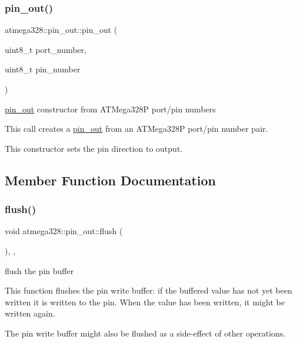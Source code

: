 \subsubsection{\texorpdfstring{pin\+\_\+out()}{pin\_out()}}
{\footnotesize\ttfamily atmega328\+::pin\+\_\+out\+::pin\+\_\+out (\begin{DoxyParamCaption}\item[{uint8\+\_\+t}]{port\+\_\+number,  }\item[{uint8\+\_\+t}]{pin\+\_\+number }\end{DoxyParamCaption})\hspace{0.3cm}{\ttfamily [inline]}}

\hyperlink{classatmega328_1_1pin__out}{pin\+\_\+out} constructor from A\+T\+Mega328P port/pin numbers

This call creates a \hyperlink{classatmega328_1_1pin__out}{pin\+\_\+out} from an A\+T\+Mega328P port/pin number pair.

This constructor sets the pin direction to output. 

\subsection{Member Function Documentation}
\mbox{\label{classatmega328_1_1pin__out_a12371a15efd326dc559301a0751b899e}} 
\subsubsection{\texorpdfstring{flush()}{flush()}}
{\footnotesize\ttfamily void atmega328\+::pin\+\_\+out\+::flush (\begin{DoxyParamCaption}{ }\end{DoxyParamCaption})\hspace{0.3cm}{\ttfamily [inline]}, {\ttfamily [override]}, {\ttfamily [virtual]}}





flush the pin buffer

This function flushes the pin write buffer\+: if the buffered value has not yet been written it is written to the pin. When the value has been written, it might be written again.

The pin write buffer might also be flushed as a side-\/effect of other operations. 

